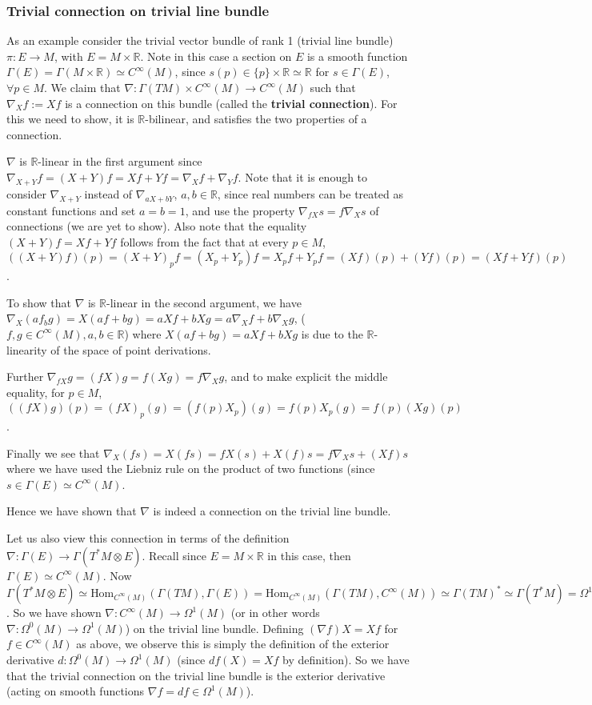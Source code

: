 \documentclass[a4paper]{article}
\theoremstyle{definition} \newtheorem*{definition}{Definition}
\theoremstyle{definition} \newtheorem*{definitions}{Definitions}
\theoremstyle{plain} \newtheorem{theorem}{Theorem}[section]
\theoremstyle{plain} \newtheorem{proposition}[theorem]{Proposition}
\theoremstyle{plain} \newtheorem{corollary}[theorem]{Corollary}
\theoremstyle{plain} \newtheorem{lemma}[theorem]{Lemma}
\theoremstyle{plain} \newtheorem{example}[theorem]{Example}
\newcommand{\defn}[1]{\textbf{#1}}
\newcommand{\realnos}{\mathbb{R}}
\newcommand{\Hom}{\text{Hom}}
\newcommand{\smooth}{C^\infty}
\begin{document}
\subsubsection{Trivial connection on trivial line bundle}
As an example consider the trivial vector bundle of rank 1 (trivial line bundle)
$\pi:E\to M$, with $E=M\times \realnos$.
Note in this case a section on $E$ is a smooth function $\Gamma(E)=\Gamma(M\times \realnos)\simeq \smooth(M)$, since $s(p)\in \{p\}\times \realnos \simeq \realnos$ for $s\in \Gamma(E)$, $\forall p\in M$.
We claim that $\nabla: \Gamma(TM)\times \smooth(M)\to \smooth(M)$ such that $\nabla_X f := Xf$ is a connection on this bundle (called the \defn{trivial connection}). For this we need to show, it is $\realnos$-bilinear, and satisfies the two properties of a connection. 

$\nabla$ is $\realnos$-linear in the first argument since $\nabla_{X+Y}f=(X+Y)f=Xf+Yf=\nabla_Xf + \nabla_Yf$. Note that it is enough to consider $\nabla_{X+Y}$ instead of $\nabla_{aX+bY}$, $a,b\in \realnos$, since real numbers can be treated as constant functions and set $a=b=1$, and use the property $\nabla_{fX}s=f\nabla_X s$ of connections (we are yet to show). Also note that the equality $(X+Y)f=Xf+Yf$ follows from the fact that at every $p\in M$,
$((X+Y)f)(p)=(X+Y)_pf=(X_p+Y_p)f=X_pf+Y_pf=(Xf)(p)+(Yf)(p)=(Xf+Yf)(p)$.

To show that $\nabla$ is $\realnos$-linear in the second argument, we have $\nabla_X(af_bg)=X(af+bg)=aXf+bXg=a\nabla_Xf + b\nabla_X g$, ($f, g \in \smooth (M), a,b\in \realnos$) where $X(af+bg)=aXf+bXg$ is due to the $\realnos$-linearity of the space of point derivations. 

Further $\nabla_{fX}g=(fX)g=f(Xg)=f\nabla_X g$, and to make explicit the middle equality, for $p\in M$, $((fX)g)(p)=(fX)_p(g)=(f(p)X_p)(g)=f(p)X_p(g)=f(p)(Xg)(p)$.

Finally we see that $\nabla_X(fs)=X(fs)=fX(s)+X(f)s=f\nabla_Xs + (Xf)s$ where we have used the Liebniz rule on the product of two functions (since $s\in \Gamma(E)\simeq \smooth(M)$.

Hence we have shown that $\nabla$ is indeed a connection on the trivial line bundle. 

Let us also view this connection in terms of the definition $\nabla:\Gamma(E)\to \Gamma(T^*M\otimes E)$. Recall since $E=M\times \realnos$ in this case, then $\Gamma(E)\simeq \smooth (M)$. Now $\Gamma(T^*M\otimes E)\simeq \Hom_{\smooth(M)}(\Gamma(TM), \Gamma(E)) = \Hom_{\smooth(M)}(\Gamma(TM), \smooth(M)) \simeq \Gamma(TM)^* \simeq \Gamma(T^*M)=\Omega^1(M)$. So we have shown $\nabla:\smooth(M)\to \Omega^1(M)$ (or in other words $\nabla:\Omega^0(M)\to \Omega^1(M)$) on the trivial line bundle. Defining $(\nabla f)X=Xf$ for $f\in \smooth(M)$ as above, we observe this is simply the definition of the exterior derivative $d:\Omega^0(M)\to \Omega^1(M)$ (since $df(X)=Xf$ by definition). So we have that the trivial connection on the trivial line bundle is the exterior derivative (acting on smooth functions $\nabla f=df \in \Omega^1(M)$). 
\end{document}
